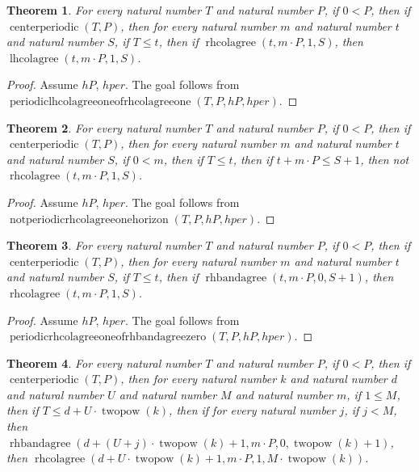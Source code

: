 \documentclass[11pt]{article}
\newtheorem{theorem}{Theorem}[section]
\theoremstyle{definition}
\begin{document}
\begin{theorem}
\label{ll:paper:periodic-lhcolagree-one-of-rhcolagree-one}
For every natural number \(T\) and natural number \(P\), if \(0 < P\), then if \(\operatorname{centerperiodic}(T, P)\), then for every natural number \(m\) and natural number \(t\) and natural number \(S\), if \(T \le t\), then if \(\operatorname{rhcolagree}(t, m \cdot P, 1, S)\), then \(\operatorname{lhcolagree}(t, m \cdot P, 1, S)\).
\end{theorem}
\begin{proof}
Assume \(hP\), \(hper\).
The goal follows from \(\operatorname{periodiclhcolagreeoneofrhcolagreeone}(T, P, hP, hper)\).
\end{proof}
\begin{theorem}
\label{ll:paper:not-periodic-rhcolagree-one-horizon}
For every natural number \(T\) and natural number \(P\), if \(0 < P\), then if \(\operatorname{centerperiodic}(T, P)\), then for every natural number \(m\) and natural number \(t\) and natural number \(S\), if \(0 < m\), then if \(T \le t\), then if \(t + m \cdot P \le S + 1\), then not \(\operatorname{rhcolagree}(t, m \cdot P, 1, S)\).
\end{theorem}
\begin{proof}
Assume \(hP\), \(hper\).
The goal follows from \(\operatorname{notperiodicrhcolagreeonehorizon}(T, P, hP, hper)\).
\end{proof}
\begin{theorem}
\label{ll:paper:periodic-rhcolagree-one-of-rhbandagree-zero}
For every natural number \(T\) and natural number \(P\), if \(0 < P\), then if \(\operatorname{centerperiodic}(T, P)\), then for every natural number \(m\) and natural number \(t\) and natural number \(S\), if \(T \le t\), then if \(\operatorname{rhbandagree}(t, m \cdot P, 0, S + 1)\), then \(\operatorname{rhcolagree}(t, m \cdot P, 1, S)\).
\end{theorem}
\begin{proof}
Assume \(hP\), \(hper\).
The goal follows from \(\operatorname{periodicrhcolagreeoneofrhbandagreezero}(T, P, hP, hper)\).
\end{proof}
\begin{theorem}
\label{ll:paper:periodic-rhcolagree-one-of-finite-sectors}
For every natural number \(T\) and natural number \(P\), if \(0 < P\), then if \(\operatorname{centerperiodic}(T, P)\), then for every natural number \(k\) and natural number \(d\) and natural number \(U\) and natural number \(M\) and natural number \(m\), if \(1 \le M\), then if \(T \le d + U \cdot \operatorname{twopow}(k)\), then if for every natural number \(j\), if \(j < M\), then \(\operatorname{rhbandagree}(d + (U + j) \cdot \operatorname{twopow}(k) + 1, m \cdot P, 0, \operatorname{twopow}(k) + 1)\), then \(\operatorname{rhcolagree}(d + U \cdot \operatorname{twopow}(k) + 1, m \cdot P, 1, M \cdot \operatorname{twopow}(k))\).
\end{theorem}
\end{document}
